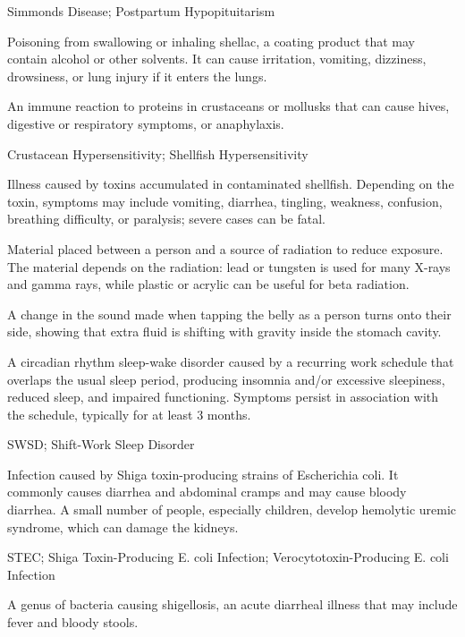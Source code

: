 \synonyms
Simmonds Disease; Postpartum Hypopituitarism

 Poisoning from swallowing or inhaling shellac, a coating product that may contain alcohol or other solvents. It can cause irritation, vomiting, dizziness, drowsiness, or lung injury if it enters the lungs.

 An immune reaction to proteins in crustaceans or mollusks that can cause hives, digestive or respiratory symptoms, or anaphylaxis.

\synonyms
Crustacean Hypersensitivity; Shellfish Hypersensitivity

 Illness caused by toxins accumulated in contaminated shellfish. Depending on the toxin, symptoms may include vomiting, diarrhea, tingling, weakness, confusion, breathing difficulty, or paralysis; severe cases can be fatal.

 Material placed between a person and a source of radiation to reduce exposure. The material depends on the radiation: lead or tungsten is used for many X-rays and gamma rays, while plastic or acrylic can be useful for beta radiation.

 A change in the sound made when tapping the belly as a person turns onto their side, showing that extra fluid is shifting with gravity inside the stomach cavity.

 A circadian rhythm sleep-wake disorder caused by a recurring work schedule that overlaps the usual sleep period, producing insomnia and/or excessive sleepiness, reduced sleep, and impaired functioning. Symptoms persist in association with the schedule, typically for at least 3 months.

\synonyms
SWSD; Shift-Work Sleep Disorder

 Infection caused by Shiga toxin-producing strains of Escherichia coli. It commonly causes diarrhea and abdominal cramps and may cause bloody diarrhea. A small number of people, especially children, develop hemolytic uremic syndrome, which can damage the kidneys.

\synonyms
STEC; Shiga Toxin-Producing E. coli Infection; Verocytotoxin-Producing E. coli Infection

 A genus of bacteria causing shigellosis, an acute diarrheal illness that may include fever and bloody stools.

